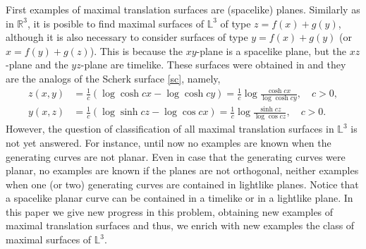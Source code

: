 \documentclass[a4paper,12pt]{amsart}
\numberwithin{equation}{section}
\theoremstyle{definition}
\def\r{\mathbb R}
\def\r{\mathbb R}
\def\rr{\mathbb L}
\begin{document}
First  examples of maximal translation surfaces are (spacelike) planes. Similarly as in $\r^3$, it is posible to find maximal surfaces of $\rr^3$ of type $z=f(x)+g(y)$, although it is also necessary to consider surfaces of type  $y=f(x)+g(y)$ (or $x=f(y)+g(z)$). This is   because the $xy$-plane  is a spacelike plane,  but the $xz$-plane  and the $yz$-plane are timelike. These surfaces were obtained in \cite{wo} and they are the analogs of the Scherk surface \eqref{sc}, namely, 
\begin{equation}\label{sc2}
\begin{split}z(x,y)&=\frac{1}{c}\left(\log \cosh{cx}-\log \cosh{cy}\right)=\frac{1}{c} \log \frac{\cosh{cx}}{\log \cosh{cy}},\quad c>0,\\
y(x,z)&=\frac{1}{c}\left(\log \sinh{cz}-\log\cos{cx}\right)=\frac{1}{c} \log \frac{\sinh{cz}}{\log \cos{cz}},\quad c>0.
\end{split}
\end{equation}
 However, the question of classification of all maximal translation  surfaces in $\rr^3$ is not yet answered. For instance, until now no  examples are known when the generating curves are not planar. Even in case that the generating curves were planar, no examples are known if the planes are not orthogonal, neither examples when one (or two) generating curves are contained in lightlike planes. Notice that a spacelike planar curve can be contained in a timelike or in a lightlike plane.  In this paper we give new progress in this problem, obtaining new examples of maximal translation  surfaces and thus, we enrich with  new examples   the class of maximal surfaces of $\rr^3$. 
\end{document}
